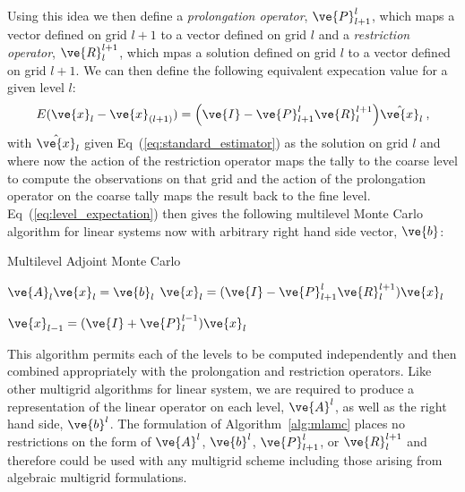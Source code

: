 \documentclass[note]{TechNote}
\begin{document}
Using this idea we then define a \textit{prolongation operator},
$\ve{P}_{l+1}^l$, which maps a vector defined on grid $l+1$ to a
vector defined on grid $l$ and a \textit{restriction operator},
$\ve{R}_l^{l+1}$, which mpas a solution defined on grid $l$ to a
vector defined on grid $l+1$. We can then define the following
equivalent expecation value for a given level $l$:
\begin{equation}
  E(\ve{x}_{l} - \ve{x}_{(l+1)}) = \Big(\ve{I} - \ve{P}_{l+1}^l
  \ve{R}_l^{l+1}\Big) \hat{\ve{x}}_{l}\:,
  \label{eq:level_expectation}
\end{equation}
with $\hat{\ve{x}}_{l}$ given Eq~(\ref{eq:standard_estimator}) as the
solution on grid $l$ and where now the action of the restriction
operator maps the tally to the coarse level to compute the
observations on that grid and the action of the prolongation operator
on the coarse tally maps the result back to the fine
level. Eq~(\ref{eq:level_expectation}) then gives the following
multilevel Monte Carlo algorithm for linear systems now with arbitrary
right hand side vector, $\ve{b}$:
\begin{algorithm}[h!]
  \caption{Multilevel Adjoint Monte Carlo}
  \label{alg:mlamc}
  \begin{algorithmic}[1]

    \State $\ve{A}_l \ve{x}_l = \ve{b}_l$
    \State $\ve{x}_l = (\ve{I} - \ve{P}_{l+1}^l\ve{R}_l^{l+1}) \ve{x}_{l}$
    \EndIf
    \EndFor

    \State $\ve{x}_{l-1} = ( \ve{I} + \ve{P}_{l}^{l-1} ) \ve{x}_{l}$
    \EndFor

  \end{algorithmic}
\end{algorithm}
This algorithm permits each of the levels to be computed independently
and then combined appropriately with the prolongation and restriction
operators. Like other multigrid algorithms for linear system, we are
required to produce a representation of the linear operator on each
level, $\ve{A}^l$, as well as the right hand side, $\ve{b}^l$. The
formulation of Algorithm~\ref{alg:mlamc} places no restrictions on the
form of $\ve{A}^l$, $\ve{b}^l$, $\ve{P}_{l+1}^l$, or $\ve{R}_l^{l+1}$
and therefore could be used with any multigrid scheme including those
arising from algebraic multigrid formulations.
\end{document}
